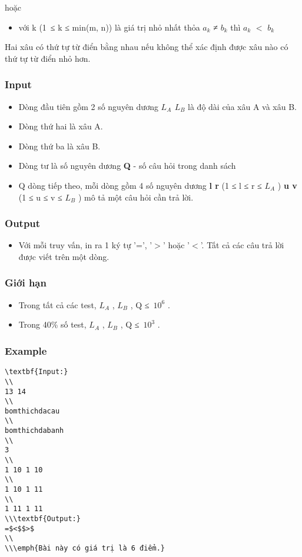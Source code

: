   hoặc  
\begin{itemize}
	\item     với k (1 ≤ k ≤ min(m, n)) là giá trị nhỏ nhất thỏa $a_{k}$    ≠ $b_{k}$    thì $a_{k}$    $<$ $b_{k}$
\end{itemize}

   Hai xâu có thứ tự từ điển bằng nhau nếu không thể xác định được xâu nào có thứ tự từ điển nhỏ hơn.  
\begin{itemize}
\end{itemize}

\subsubsection{   Input  }
\begin{itemize}
	\item     Dòng đầu tiên gồm 2 số nguyên dương    \textbf{     $L_{A}$     $L_{B}$}    là độ dài của xâu A và xâu B.   
	\item     Dòng thứ hai là xâu A.   
	\item     Dòng thứ ba là xâu B.   
	\item     Dòng tư là số nguyên dương    \textbf{     Q    }    - số câu hỏi trong danh sách   
	\item     Q dòng tiếp theo, mỗi dòng gồm 4 số nguyên dương    \textbf{     l r    }    (1 ≤ l ≤ r ≤ $L_{A}$    )    \textbf{     u v    }    (1 ≤ u ≤ v ≤ $L_{B}$    ) mô tả một câu hỏi cần trả lời.   
\end{itemize}

\subsubsection{   Output  }
\begin{itemize}
	\item     Với mỗi truy vấn, in ra 1 ký tự '=', '$>$' hoặc '$<$'. Tất cả các câu trả lời được viết trên một dòng.   
\end{itemize}

\subsubsection{   Giới hạn  }
\begin{itemize}
	\item     Trong tất cả các test, $L_{A}$    , $L_{B}$    , Q ≤ $10^{6}$    .   
	\item     Trong 40\% số test, $L_{A}$    , $L_{B}$    , Q ≤ $10^{3}$    .   
\end{itemize}

\subsubsection{   Example  }
\begin{verbatim}
\textbf{Input:}
\\
13 14
\\
bomthichdacau
\\
bomthichdabanh
\\
3
\\
1 10 1 10
\\
1 10 1 11
\\
1 11 1 11
\\\textbf{Output:}
=$<$$>$
\\
\\\emph{Bài này có giá trị là 6 điểm.}\end{verbatim}
